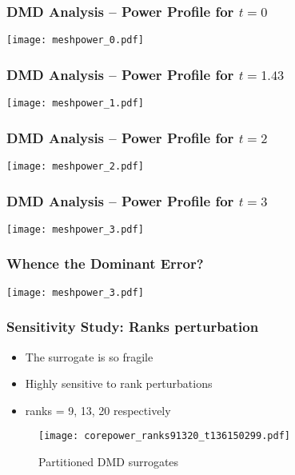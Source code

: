 \documentclass[fleqn]{beamer}
\begin{document}
\begin{frame}
\frametitle{DMD Analysis -- Power Profile for $t = 0$}

\texttt{[image: meshpower\_0.pdf]}

\end{frame}

\begin{frame}
\frametitle{DMD Analysis -- Power Profile for $t = 1.43$}

\texttt{[image: meshpower\_1.pdf]}

\end{frame}

\begin{frame}
\frametitle{DMD Analysis -- Power Profile for $t = 2$}

\texttt{[image: meshpower\_2.pdf]}

\end{frame}

\begin{frame}
\frametitle{DMD Analysis -- Power Profile for $t = 3$}

\texttt{[image: meshpower\_3.pdf]}
 
\end{frame}

\begin{frame}
\frametitle{Whence the Dominant Error?}

\texttt{[image: meshpower\_3.pdf]}
 
\end{frame}

\begin{frame}
\frametitle{Sensitivity Study: Ranks perturbation}
\begin{itemize}
 \item The surrogate is so fragile
 \item Highly sensitive to rank perturbations
 \item ranks = 9, 13, 20 respectively
\end{itemize}

\begin{figure}[ht]

\texttt{[image: corepower\_ranks91320\_t136150299.pdf]}
\caption{Partitioned DMD surrogates}
\end{figure}
\end{frame}
\end{document}
